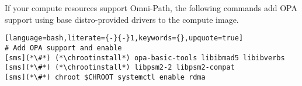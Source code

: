 If your compute resources support Omni-Path, the following commands add OPA
support using base distro-provided drivers to the compute image.

\begin{lstlisting}[language=bash,literate={-}{-}1,keywords={},upquote=true]
# Add OPA support and enable
[sms](*\#*) (*\chrootinstall*) opa-basic-tools libibmad5 libibverbs
[sms](*\#*) (*\chrootinstall*) libpsm2-2 libpsm2-compat
[sms](*\#*) chroot $CHROOT systemctl enable rdma
\end{lstlisting}
